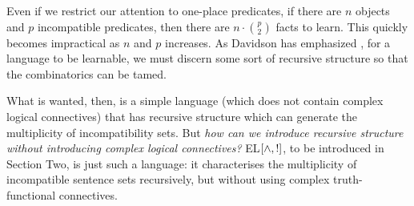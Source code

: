 \NI Even if we restrict our attention to one-place predicates, if
there are $n$ objects and $p$ incompatible predicates, then there are
$n\cdot{p \choose 2}$ facts to learn.  This quickly becomes impractical as $n$ and
$p$ increases.  As Davidson has emphasized \cite{davidson}, for a
language to be learnable, we must discern some sort of recursive
structure so that the combinatorics can be tamed.

What is wanted, then, is a simple language (which does not contain
complex logical connectives) that has recursive structure which can
generate the multiplicity of incompatibility sets.  But \emph{how can
  we introduce recursive structure without introducing complex logical
  connectives?} EL$[\land, !]$, to be introduced in Section Two, is
just such a language: it characterises the multiplicity of
incompatible sentence sets recursively, but without using complex
truth-functional connectives.

